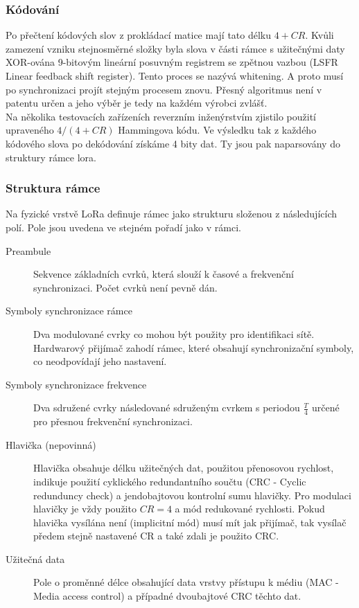 \documentclass{ctuthesis}
\begin{document}
\subsubsection{Kódování}
Po přečtení kódových slov z prokládací matice mají tato délku $4 + CR$. Kvůli zamezení vzniku stejnosměrné složky byla slova v části rámce s užitečnými daty XOR-ována 9-bitovým lineární posuvným registrem se zpětnou vazbou (LSFR Linear feedback shift register). Tento proces se nazývá whitening. A proto musí po synchronizaci projít stejným procesem znovu. Přesný algoritmus není v patentu určen a jeho výběr je tedy na každém výrobci zvlášť. \\
Na několika testovacích zařízeních \cite{gr-lora2018} reverzním inženýrstvím zjistilo použití upraveného $4/(4 + CR)$ Hammingova kódu. Ve výsledku tak z každého kódového slova po dekódování získáme 4 bity dat. Ty jsou pak naparsovány do struktury rámce lora.

\subsubsection{Struktura rámce}
Na fyzické vrstvě LoRa definuje rámec jako strukturu složenou z následujících polí. Pole jsou uvedena ve stejném pořadí jako v rámci.
\begin{description}
\item[Preambule]
Sekvence základních cvrků, která slouží k časové a frekvenční synchronizaci. Počet cvrků není pevně dán.
\item[Symboly synchronizace rámce]
Dva modulované cvrky co mohou být použity pro identifikaci sítě. Hardwarový přijímač zahodí rámec, které obsahují synchronizační symboly, co neodpovídají jeho nastavení.
\item[Symboly synchronizace frekvence]
Dva sdružené cvrky následované sdruženým cvrkem s periodou $\frac{T}{4}$ určené pro přesnou frekvenční synchronizaci.
\item[Hlavička (nepovinná)]
Hlavička obsahuje délku užitečných dat, použitou přenosovou rychlost, indikuje použití cyklického redundantního součtu (CRC - Cyclic redunduncy check) a jendobajtovou kontrolní sumu hlavičky. Pro modulaci hlavičky je vždy použito $CR =4$ a mód redukované rychlosti. Pokud hlavička vysílána není (implicitní mód) musí mít jak přijímač, tak vysílač předem stejně nastavené CR a také zdali je použito CRC.
\item[Užitečná data]
Pole o proměnné délce obsahující data vrstvy přístupu k médiu (MAC - Media access control) a případné dvoubajtové CRC těchto dat.
\end{description}
\end{document}
